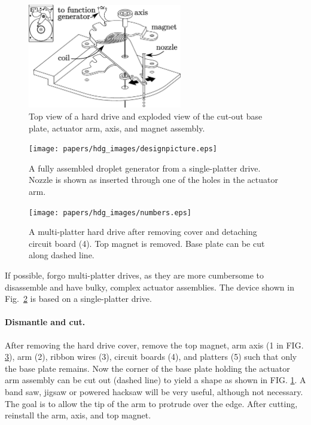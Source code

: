 \documentclass[11.5pt,oneside]{book}
\newcommand*{\figref}[1]{Fig.~\ref{#1}}
\begin{document}
\begin{figure}
\centering
\includegraphics[width=0.6\textwidth]{papers/hdg_images/dge.eps}
\caption{Top view of a hard drive and exploded view of the cut-out base
plate, actuator arm, axis, and magnet assembly. \label{fig:designschematic}}
\end{figure}
\begin{figure}
\centering
\texttt{[image: papers/hdg\_images/designpicture.eps]}
\caption{A fully assembled droplet generator from a single-platter drive. Nozzle is shown as inserted
through one of the holes in the actuator arm. \label{fig:photo}}
\end{figure}
\begin{figure}
\centering
\texttt{[image: papers/hdg\_images/numbers.eps]}
\caption{A multi-platter hard drive after removing cover and detaching circuit board (4). Top
        magnet is removed. Base plate can be cut along dashed line. \label{fig:numbers}}
\end{figure}

If possible, forgo multi-platter drives, as they are more cumbersome to disassemble and have
bulky, complex actuator assemblies. The device shown in \figref{fig:photo}
is based on a single-platter drive.

\paragraph{Dismantle and cut.} After removing the hard drive cover, remove
the top magnet, arm axis (1 in FIG. \ref{fig:numbers}), arm (2), ribbon wires (3), circuit boards (4), and
platters (5) such that only the base plate remains. Now the corner of the base plate holding
the actuator arm assembly can be cut out (dashed line) to yield a shape as shown in FIG.
\ref{fig:designschematic}. A band saw, jigsaw or powered hacksaw will be very
useful, although not necessary. The goal is to allow the tip of the arm to
protrude over the edge. After cutting, reinstall the arm, axis, and top magnet.
\end{document}
